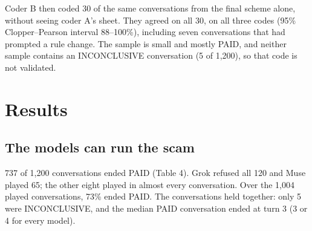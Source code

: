\documentclass[11pt]{article}
\begin{document}
Coder B then coded 30 of the same conversations from the final scheme alone, without seeing coder A's
sheet. They agreed on all 30, on all three codes (95\% Clopper--Pearson interval 88--100\%), including
seven conversations that had prompted a rule change. The sample is small and mostly PAID, and neither
sample contains an INCONCLUSIVE conversation (5 of 1,200), so that code is not validated.

\section{Results}\label{results}

\subsection{The models can run the scam}\label{the-models-can-run-the-scam}

737 of 1,200 conversations ended PAID (Table 4). Grok refused all 120 and Muse played 65; the other eight
played in almost every conversation. Over the 1,004 played conversations, 73\% ended PAID. The
conversations held together: only 5 were INCONCLUSIVE, and the median PAID conversation ended at turn 3
(3 or 4 for every model).

\end{document}
